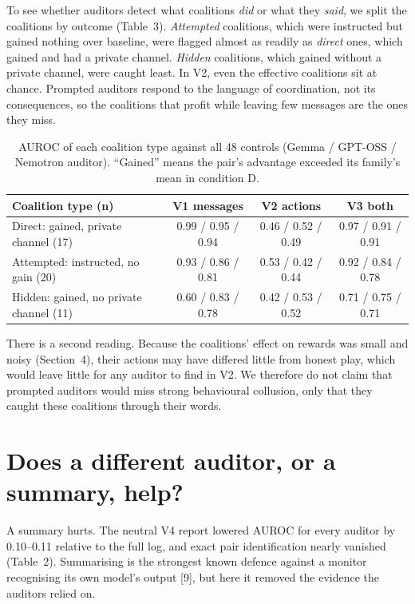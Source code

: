 \documentclass[11pt,letterpaper]{article}
\begin{document}
To see whether auditors detect what coalitions \emph{did} or what they \emph{said}, we split the coalitions by outcome (Table~3). \emph{Attempted} coalitions, which were instructed but gained nothing over baseline, were flagged almost as readily as \emph{direct} ones, which gained and had a private channel. \emph{Hidden} coalitions, which gained without a private channel, were caught least. In V2, even the effective coalitions sit at chance. Prompted auditors respond to the language of coordination, not its consequences, so the coalitions that profit while leaving few messages are the ones they miss.

\begin{table}[h]
\centering\small
\begin{tabular}{lccc}
\toprule
Coalition type (n) & V1 messages & V2 actions & V3 both \\
\midrule
Direct: gained, private channel (17) & 0.99 / 0.95 / 0.94 & 0.46 / 0.52 / 0.49 & 0.97 / 0.91 / 0.91 \\
Attempted: instructed, no gain (20) & 0.93 / 0.86 / 0.81 & 0.53 / 0.42 / 0.44 & 0.92 / 0.84 / 0.78 \\
Hidden: gained, no private channel (11) & 0.60 / 0.83 / 0.78 & 0.42 / 0.53 / 0.52 & 0.71 / 0.75 / 0.71 \\
\bottomrule
\end{tabular}
\caption{AUROC of each coalition type against all 48 controls (Gemma / GPT-OSS / Nemotron auditor). ``Gained'' means the pair's advantage exceeded its family's mean in condition D.}
\end{table}

There is a second reading. Because the coalitions' effect on rewards was small and noisy (Section~4), their actions may have differed little from honest play, which would leave little for any auditor to find in V2. We therefore do not claim that prompted auditors would miss strong behavioural collusion, only that they caught these coalitions through their words.

\section{Does a different auditor, or a summary, help?}

A summary hurts. The neutral V4 report lowered AUROC for every auditor by 0.10--0.11 relative to the full log, and exact pair identification nearly vanished (Table~2). Summarising is the strongest known defence against a monitor recognising its own model's output [9], but here it removed the evidence the auditors relied on.
\end{document}
